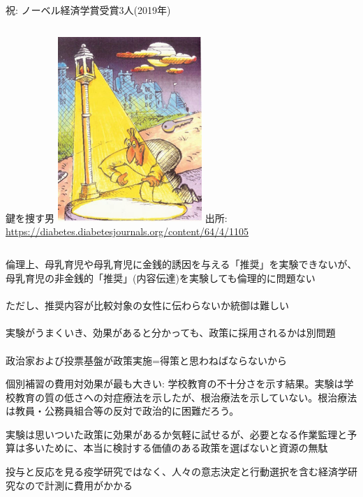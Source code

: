 \begin{frame}{祝: ノーベル経済学賞受賞3人(2019年)}
\begin{columns}[T]
\column{.2\paperwidth}
\vspace{2ex}鍵を捜す男
\column{.45\paperwidth}
\pause
\hfil\includegraphics[height = 7cm]{ImpactEvaluation/figure/FindKey.jpg}
\column{.3\paperwidth}
{\footnotesize 出所: \url{https://diabetes.diabetesjournals.org/content/64/4/1105}}
\end{columns}
\end{frame}

\begin{frame}{}
倫理上、母乳育児や母乳育児に金銭的誘因を与える「推奨」を実験できないが、母乳育児の非金銭的「推奨」(内容伝達)を実験しても倫理的に問題ない\\~\\
\pause
ただし、推奨内容が比較対象の女性に伝わらないか統御は難しい\\~\\
\pause
実験がうまくいき、効果があると分かっても、政策に採用されるかは別問題\\~\\
\pause
政治家および投票基盤が政策実施=得策と思わねばならないから
\pause
\begin{dinglist}{43}
\vspace{1.0ex}\setlength{\itemsep}{1.0ex}\setlength{\baselineskip}{12pt}
\item	個別補習の費用対効果が最も大きい: %
学校教育の不十分さを示す結果。実験は学校教育の質の低さへの対症療法を示したが、根治療法を示していない。根治療法は教員・公務員組合等の反対で政治的に困難だろう。
\end{dinglist}
\vspace{3ex}
\pause
実験は思いついた政策に効果があるか気軽に試せるが、必要となる作業監理と予算は多いために、本当に検討する価値のある政策を選ばないと資源の無駄
\pause
\begin{dinglist}{43}
\vspace{1.0ex}\setlength{\itemsep}{1.0ex}\setlength{\baselineskip}{12pt}
\item	投与と反応を見る疫学研究ではなく、人々の意志決定と行動選択を含む経済学研究なので計測に費用がかかる
\end{dinglist}
\end{frame}

